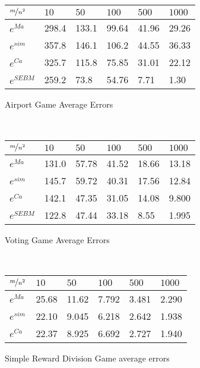 \documentclass[]{interact}
\theoremstyle{plain}%
\theoremstyle{definition}
\theoremstyle{remark}
\begin{document}
\begin{table*}[h]
    \centering 
    \begin{subfigure}[]{0.8\textwidth}
        \centering
        \caption{Airport Game Average Errors}\label{tab1}
			\begin{tabular}{llllll}
			\hline
			$\nicefrac{m}{n^2}$ & $10$ & $50$ & $100$ & $500$ & $1000$ \\
			\hline
			$e^{Ma}$   & 298.4 & 133.1 & 99.64 & 41.96 & 29.26 \\
			$e^{sim}$  & 357.8 & 146.1 & 106.2 & 44.55 & 36.33 \\
			$e^{Ca}$   & 325.7 & 115.8 & 75.85 & 31.01 & 22.12 \\
			$e^{SEBM}$ & 259.2 & 73.8 & 54.76 & 7.71 & 1.30  \\
			\hline
			\end{tabular}
    \end{subfigure}
	\\\vspace{4mm}
    \begin{subfigure}[]{0.8\textwidth}
        \centering
        \caption{Voting Game Average Errors}\label{tab2}
			\begin{tabular}{llllll}
			\hline
			$\nicefrac{m}{n^2}$ & $10$ & $50$ & $100$ & $500$ & $1000$ \\
			\hline
			$e^{Ma}$    & 131.0 & 57.78 & 41.52 & 18.66 & 13.18 \\
			$e^{sim}$   & 145.7 & 59.72 & 40.31 & 17.56 & 12.84 \\
			$e^{Ca}$    & 142.1 & 47.35 & 31.05 & 14.08 & 9.800 \\
			$e^{SEBM}$  & 122.8 & 47.44 & 33.18 & 8.55 & 1.995  \\
			\hline
			\end{tabular}
    \end{subfigure}
	\\\vspace{4mm}
    \begin{subfigure}[]{0.8\textwidth}
        \centering
        \caption{Simple Reward Division Game average errors}\label{tab3}
			\begin{tabular}{llllll}
			\hline
			$\nicefrac{m}{n^2}$ & $10$ & $50$ & $100$ & $500$ & $1000$ \\
			\hline
			$e^{Ma}$    & 25.68 & 11.62 & 7.792 & 3.481 & 2.290 \\
			$e^{sim}$   & 22.10 & 9.045 & 6.218 & 2.642 & 1.938 \\
			$e^{Ca}$    & 22.37 & 8.925 & 6.692 & 2.727 & 1.940 \\

\end{tabular}
\end{subfigure}
\end{table*}
\end{document}
